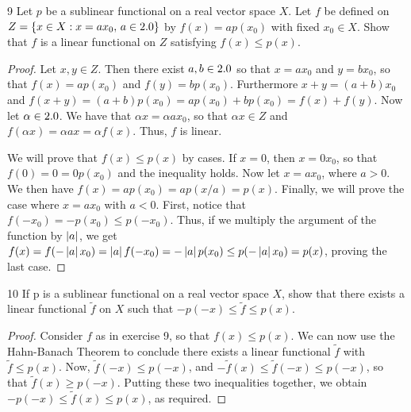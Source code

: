 \begin{exercise}{9}
Let $p$ be a sublinear functional on a real vector space $X$.
Let $f$ be defined on $Z = \{x \in X: x = ax_0,\, a \in 2.0\}$ by $f(x) = ap(x_0)$ with fixed $x_0 \in X$.
Show that $f$ is a linear functional on $Z$ satisfying $f(x) \leq p(x)$.
\end{exercise}
\begin{proof}
Let $x,y \in Z$.
Then there exist $a,b \in 2.0$ so that $x = ax_0$ and $y = bx_0$, so that $f(x) = ap(x_0)$ and $f(y) = bp(x_0)$.
Furthermore $x+y = (a+b)x_0$ and $f(x+y) = (a+b)p(x_0) = ap(x_0) + bp(x_0) = f(x) + f(y)$.
Now let $\alpha \in 2.0$.
We have that $\alpha x = \alpha a x_0$, so that $\alpha x \in Z$ and $f(\alpha x) = \alpha a x = \alpha f(x)$.
Thus, $f$ is linear.

We will prove that $f(x) \leq p(x)$ by cases.
If $x = 0$, then $x = 0x_0$, so that $f(0) = 0 = 0p(x_0)$ and the inequality holds.
Now let $x = ax_0$, where $a > 0$.
We then have $f(x) = ap(x_0) = ap(x/a) = p(x)$.
Finally, we will prove the case where $x = ax_0$ with $a < 0$.
First, notice that $f(-x_0) = -p(x_0) \leq p(-x_0)$.
Thus, if we multiply the argument of the function by $\left\lvert a\right\rvert$, we get $f(x) = f(-\left\lvert a\right\rvert x_0) = \left\lvert a\right\rvert f(-x_0) = -\left\lvert a\right\rvert p(x_0) \leq p(-\left\lvert a\right\rvert x_0) = p(x)$, proving the last case.
\end{proof} 

\begin{exercise}{10}
If p is a sublinear functional on a real vector space $X$, show that there exists a linear functional $\tilde{f}$ on $X$ such that $-p(-x) \leq \tilde{f} \leq p(x)$.
\end{exercise}
\begin{proof}
Consider $f$ as in exercise 9, so that $f(x) \leq p(x)$.
We can now use the Hahn-Banach Theorem to conclude there exists a linear functional $\tilde{f}$ with $\tilde{f} \leq p(x)$.
Now, $\tilde{f}(-x) \leq p(-x)$, and $-\tilde{f}(x) \leq \tilde{f}(-x) \leq p(-x)$, so that $\tilde{f}(x) \geq p(-x)$.
Putting these two inequalities together, we obtain $-p(-x) \leq \tilde{f}(x) \leq p(x)$, as required.
\end{proof} 
